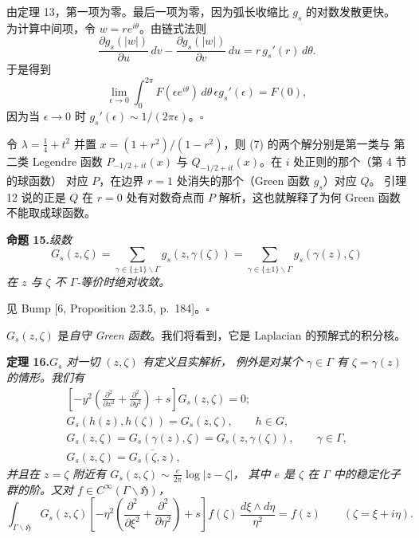 由定理 13，第一项为零。最后一项为零，因为弧长收缩比 $g_{s}$ 的对数发散更快。
为计算中间项，令 $w=re^{i\theta}$。由链式法则
\[
\frac{\partial g_{s}(|w|)}{\partial u}\,dv-\frac{\partial g_{s}(|w|)}{\partial v}\,du
=r\,g_{s}'(r)\,d\theta .
\]
于是得到
\[
\lim_{\epsilon\to0}\int_{0}^{2\pi}F(\epsilon e^{i\theta})\,d\theta\,\epsilon g_{s}'(\epsilon)=F(0),
\]
因为当 $\epsilon\to0$ 时 $g_{s}'(\epsilon)\sim1/(2\pi\epsilon)$。\hfill$\square$

\begin{annote}
令 $\lambda=\tfrac14+t^{2}$ 并置 $x=(1+r^{2})/(1-r^{2})$，则 (7) 的两个解分别是第一类与
第二类 Legendre 函数 $P_{-1/2+it}(x)$ 与 $Q_{-1/2+it}(x)$。在 $i$ 处正则的那个（第 4 节的球函数）
对应 $P$，在边界 $r=1$ 处消失的那个（Green 函数 $g_{s}$）对应 $Q$。
引理 12 说的正是 $Q$ 在 $r=0$ 处有对数奇点而 $P$ 解析，这也就解释了为何 Green 函数
不能取成球函数。
\par{}
\end{annote}


\par\medskip\noindent\textbf{命题 15.}\quad\emph{级数}
\[
G_{s}(z,\zeta)=\sum_{\gamma\in\{\pm1\}\backslash\Gamma}g_{s}(z,\gamma(\zeta))
=\sum_{\gamma\in\{\pm1\}\backslash\Gamma}g_{s}(\gamma(z),\zeta)
\]
\emph{在 $z$ 与 $\zeta$ 不 $\Gamma$-等价时绝对收敛。}

\smallskip
见 Bump [6, Proposition 2.3.5, p.\ 184]。\hfill$\square$

$G_{s}(z,\zeta)$ 是\emph{自守 Green 函数}。我们将看到，它是 Laplacian 的预解式的积分核。

\par\medskip\noindent\textbf{定理 16.}\quad\emph{$G_{s}$ 对一切 $(z,\zeta)$ 有定义且实解析，
例外是对某个 $\gamma\in\Gamma$ 有 $\zeta=\gamma(z)$ 的情形。我们有}
\[
\begin{gathered}
\left[-y^{2}\left(\frac{\partial^{2}}{\partial x^{2}}+\frac{\partial^{2}}{\partial y^{2}}\right)+s\right]G_{s}(z,\zeta)=0;\\
G_{s}(h(z),h(\zeta))=G_{s}(z,\zeta),\qquad h\in G,\\
G_{s}(z,\zeta)=G_{s}(\gamma(z),\zeta)=G_{s}(z,\gamma(\zeta)),\qquad\gamma\in\Gamma,\\
G_{s}(z,\zeta)=\overline{G_{s}(\zeta,z)},
\end{gathered}
\]
\emph{并且在 $z=\zeta$ 附近有 $G_{s}(z,\zeta)\sim\frac{e}{2\pi}\log|z-\zeta|$，
其中 $e$ 是 $\zeta$ 在 $\Gamma$ 中的稳定化子群的阶。又对 $f\in C^{\infty}(\Gamma\backslash\mathfrak{H})$，}
\begin{equation}\tag{9}
\int_{\Gamma\backslash\mathfrak{H}}G_{s}(z,\zeta)\left[-\eta^{2}
\left(\frac{\partial^{2}}{\partial\xi^{2}}+\frac{\partial^{2}}{\partial\eta^{2}}\right)+s\right]
f(\zeta)\,\frac{d\xi\wedge d\eta}{\eta^{2}}=f(z)\qquad(\zeta=\xi+i\eta).
\end{equation}

